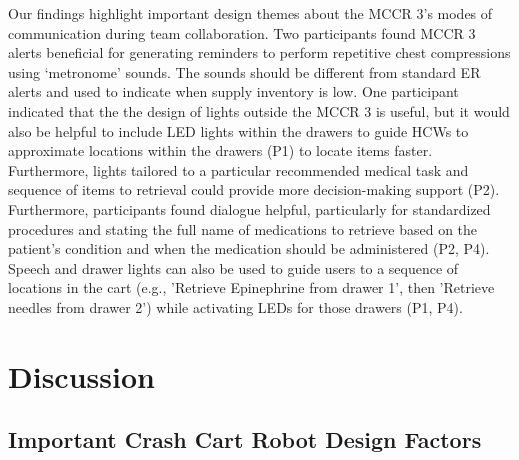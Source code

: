 Our findings highlight important design themes about the MCCR 3's modes of communication during team collaboration.
Two participants found MCCR 3 alerts beneficial for generating reminders to perform repetitive chest compressions using ‘metronome’ sounds. The sounds should be different from standard ER alerts and used to indicate when supply inventory is low.
One participant indicated that the the design of lights outside the MCCR 3 is useful, but it would also be helpful to include LED lights within the drawers to guide HCWs to approximate locations within the drawers (P1) to locate items faster. 
Furthermore, lights tailored to a particular recommended medical task and sequence of items to retrieval could provide more decision-making support (P2). 
Furthermore, participants found dialogue helpful, particularly for standardized procedures and stating the full name of medications to retrieve based on the patient's condition and when the medication should be administered (P2, P4).
Speech and drawer lights can also be used to guide users to a sequence of locations in the cart (e.g., 'Retrieve Epinephrine from drawer 1', then 'Retrieve needles from drawer 2') while activating LEDs for those drawers (P1, P4).




\section{Discussion}

\subsection{Important Crash Cart Robot Design Factors}

